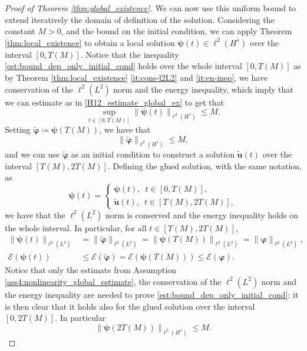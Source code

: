 \documentclass[12pt,a4paper]{amsart}
\numberwithin{equation}{section}
\newcommand{\ulu}{\boldsymbol{u}}
\newcommand{\ulpsi}{\boldsymbol{\psi}}
\newcommand{\ulphi}{\boldsymbol{\varphi}}
\begin{document}
\begin{proof}[Proof of Theorem \ref{thm:global_existence}]
		We can now use this uniform bound to extend iteratively the domain of definition of the solution. Considering the constant $M>0$, and the bound on the initial condition, we can apply Theorem \ref{thm:local_existence} to obtain a local solution $ \ulpsi(t) \in \ell^2(H^s) $ over the interval $ [0,T(M)] $. Notice that the inequality \eqref{est:bound_dep_only_initial_cond} holds over the whole interval $[0,T(M)]$ as by Theorem \ref{thm:local_existence} \ref{it:cons-l2L2} and \ref{it:en-ineq}, we have conservation of the $\ell^2(L^2)$ norm and the energy inequality, which imply that we can estimate as in \eqref{H12_estimate_global_ex} to get that 
		\begin{equation}
			\sup_{t \in [0,T(M)]} \| \ulpsi(t) \|_{\ell^2(H^{s})} \leq M. 
		\end{equation}
		Setting $ {\tilde{\ulphi}} \coloneqq \ulpsi(T(M)) $, we have that
		\begin{equation}
			\| \tilde{\ulphi} \|_{\ell^2(H^s)} \leq M,
		\end{equation}
		and we can use $\tilde{\ulphi} $ as an initial condition to construct a solution $ \tilde{\ulu}(t) $ over the interval $[T(M),2T(M)] $. Defining the glued solution, with the same notation, as 
		\begin{equation}
			\ulpsi(t) =  
			\begin{cases}
				\ulpsi(t) , \;\ t \in [0,T(M)], \\
				\tilde{\ulu}(t), \;\ t \in [T(M),2T(M)],	
			\end{cases}
		\end{equation}
		we have that the $ \ell^2(L^2) $ norm is conserved and the energy inequality holds on the whole interval. In particular, for all $t \in [T(M),2T(M)]$,
		\begin{align}
			\| \ulpsi(t) \|_{\ell^2(L^2)} &=  \| \tilde{\ulphi} \|_{\ell^2(L^2)} = \| \ulpsi(T(M)) \|_{\ell^2(L^2)} = \| \ulphi \|_{\ell^2(L^2)},   \\
			\mathcal{E}(\ulpsi(t)) &\leq  \mathcal{E}(\tilde{\ulphi}) = \mathcal{E}(\ulpsi(T(M))) \leq \mathcal{E}(\ulphi) .
		\end{align}
		Notice that only the estimate from Assumption \ref{ass4:nonlinearity_global_estimate}, the conservation of the $\ell^2(L^2)$ norm and the energy inequality are needed to prove \eqref{est:bound_dep_only_initial_cond}: it is then clear that it holds also for the glued solution over the interval $[0,2T(M)]$. In particular 
		\begin{equation}
			\| \ulpsi(2T(M)) \|_{\ell^2(H^s)} \leq M.

\end{equation}
\end{proof}
\end{document}
